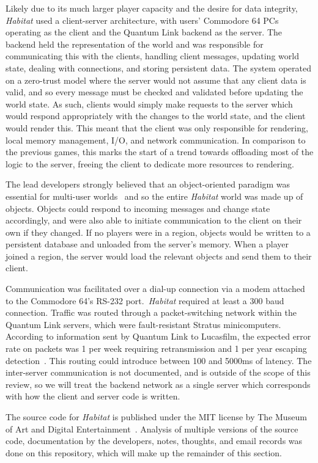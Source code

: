 Likely due to its much larger player capacity and the desire for data integrity, \textit{Habitat} used a client-server architecture, with users' Commodore 64 PCs operating as the client and the Quantum Link backend as the server. The backend held the representation of the world and was responsible for communicating this with the clients, handling client messages, updating world state, dealing with connections, and storing persistent data. The system operated on a zero-trust model where the server would not assume that any client data is valid, and so every message must be checked and validated before updating the world state. As such, clients would simply make requests to the server which would respond appropriately with the changes to the world state, and the client would render this. This meant that the client was only responsible for rendering, local memory management, I/O, and network communication. In comparison to the previous games, this marks the start of a trend towards offloading most of the logic to the server, freeing the client to dedicate more resources to rendering.

The lead developers strongly believed that an object-oriented paradigm was essential for multi-user worlds~\cite{morningstar} and so the entire \textit{Habitat} world was made up of objects. Objects could respond to incoming messages and change state accordingly, and were also able to initiate communication to the client on their own if they changed. If no players were in a region, objects would be written to a persistent database and unloaded from the server's memory. When a player joined a region, the server would load the relevant objects and send them to their client.

Communication was facilitated over a dial-up connection via a modem attached to the Commodore 64's RS-232 port.\ \textit{Habitat} required at least a 300 baud connection. Traffic was routed through a packet-switching network within the Quantum Link servers, which were fault-resistant Stratus minicomputers. According to information sent by Quantum Link to Lucasfilm, the expected error rate on packets was 1 per week requiring retransmission and 1 per year escaping detection~\cite{habitatsrc}. This routing could introduce between 100 and 5000ms of latency. The inter-server communication is not documented, and is outside of the scope of this review, so we will treat the backend network as a single server which corresponds with how the client and server code is written.

The source code for \textit{Habitat} is published under the MIT license by The Museum of Art and Digital Entertainment~\cite{habitatmade}. Analysis of multiple versions of the source code, documentation by the developers, notes, thoughts, and email records was done on this repository, which will make up the remainder of this section.

